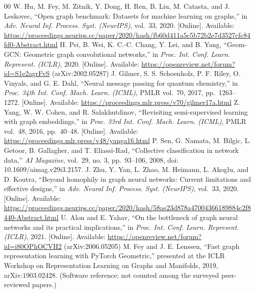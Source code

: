 \documentclass[conference]{IEEEtran}
\begin{document}
\begin{thebibliography}{00}
 W. Hu, M. Fey, M. Zitnik, Y. Dong, H. Ren, B. Liu, M. Catasta, and J. Leskovec, ``Open graph benchmark: Datasets for machine learning on graphs,'' in \emph{Adv. Neural Inf. Process. Syst. (NeurIPS)}, vol.~33, 2020. {[}Online{]}. Available: \url{https://proceedings.neurips.cc/paper/2020/hash/fb60d411a5c5b72b2e7d3527cfc84fd0-Abstract.html}
 H. Pei, B. Wei, K. C.-C. Chang, Y. Lei, and B. Yang, ``Geom-GCN: Geometric graph convolutional networks,'' in \emph{Proc. Int. Conf. Learn. Represent. (ICLR)}, 2020. {[}Online{]}. Available: \url{https://openreview.net/forum?id=S1e2agrFvS} (arXiv:2002.05287)
 J. Gilmer, S. S. Schoenholz, P. F. Riley, O. Vinyals, and G. E. Dahl, ``Neural message passing for quantum chemistry,'' in \emph{Proc. 34th Int. Conf. Mach. Learn. (ICML)}, PMLR vol.~70, 2017, pp.~1263--1272. {[}Online{]}. Available: \url{https://proceedings.mlr.press/v70/gilmer17a.html}
 Z. Yang, W. W. Cohen, and R. Salakhutdinov, ``Revisiting semi-supervised learning with graph embeddings,'' in \emph{Proc. 33rd Int. Conf. Mach. Learn. (ICML)}, PMLR vol.~48, 2016, pp.~40--48. {[}Online{]}. Available: \url{https://proceedings.mlr.press/v48/yanga16.html}
 P. Sen, G. Namata, M. Bilgic, L. Getoor, B. Gallagher, and T. Eliassi-Rad, ``Collective classification in network data,'' \emph{AI Magazine}, vol.~29, no. 3, pp.~93--106, 2008, doi: 10.1609/aimag.v29i3.2157.
 J. Zhu, Y. Yan, L. Zhao, M. Heimann, L. Akoglu, and D. Koutra, ``Beyond homophily in graph neural networks: Current limitations and effective designs,'' in \emph{Adv. Neural Inf. Process. Syst. (NeurIPS)}, vol.~33, 2020. {[}Online{]}. Available: \url{https://proceedings.neurips.cc/paper/2020/hash/58ae23d878a47004366189884c2f8440-Abstract.html}
 U. Alon and E. Yahav, ``On the bottleneck of graph neural networks and its practical implications,'' in \emph{Proc. Int. Conf. Learn. Represent. (ICLR)}, 2021. {[}Online{]}. Available: \url{https://openreview.net/forum?id=i80OPhOCVH2} (arXiv:2006.05205)
 M. Fey and J. E. Lenssen, ``Fast graph representation learning with PyTorch Geometric,'' presented at the ICLR Workshop on Representation Learning on Graphs and Manifolds, 2019, arXiv:1903.02428. (Software reference; not counted among the surveyed peer-reviewed papers.)
\end{thebibliography}
\end{document}
